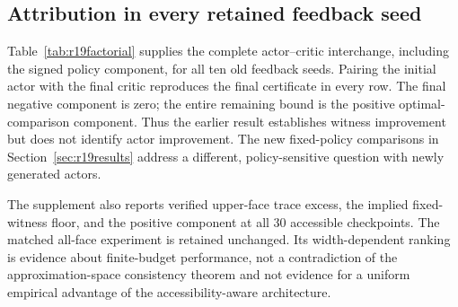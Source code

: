 \subsection{Attribution in every retained feedback seed}
Table~\ref{tab:r19factorial} supplies the complete actor--critic interchange, including the signed policy component, for all ten old feedback seeds. Pairing the initial actor with the final critic reproduces the final certificate in every row. The final negative component is zero; the entire remaining bound is the positive optimal-comparison component. Thus the earlier result establishes witness improvement but does not identify actor improvement. The new fixed-policy comparisons in Section~\ref{sec:r19results} address a different, policy-sensitive question with newly generated actors.


The supplement also reports verified upper-face trace excess, the implied fixed-witness floor, and the positive component at all 30 accessible checkpoints. The matched all-face experiment is retained unchanged. Its width-dependent ranking is evidence about finite-budget performance, not a contradiction of the approximation-space consistency theorem and not evidence for a uniform empirical advantage of the accessibility-aware architecture.
